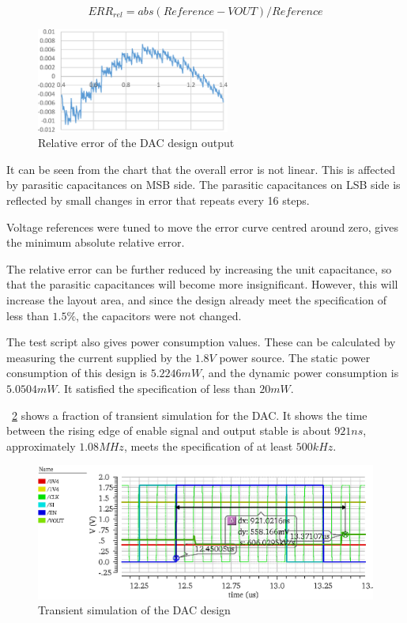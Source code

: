 \documentclass[journal]{IEEEtran}
\newcommand{\fref}[1]{\figurename~\ref{#1}}
\begin{document}
\begin{equation}
	\label{eqn_error}
	ERR_{rel} = abs(Reference - VOUT) / Reference
\end{equation}

\begin{figure}[!t]
	\centering
	\includegraphics[width=2.5in]{Error}
	\caption{Relative error of the DAC design output}
	\label{fig_error}
\end{figure}

It can be seen from the chart that the overall error is not linear. This is affected by parasitic capacitances on MSB side. The parasitic capacitances on LSB side is reflected by small changes in error that repeats every 16 steps.

Voltage references were tuned to move the error curve centred around zero, gives the minimum absolute relative error.

The relative error can be further reduced by increasing the unit capacitance, so that the parasitic capacitances will become more insignificant. However, this will increase the layout area, and since the design already meet the specification of less than $1.5 \%$, the capacitors were not changed.

The test script also gives power consumption values. These can be calculated by measuring the current supplied by the $1.8 V$ power source. The static power consumption of this design is $5.2246 mW$, and the dynamic power consumption is $5.0504 mW$. It satisfied the specification of less than $20 mW$.

\fref{fig_sim_dac} shows a fraction of transient simulation for the DAC. It shows the time between the rising edge of enable signal and output stable is about $921 ns$, approximately $1.08 MHz$, meets the specification of at least $500 kHz$.

\begin{figure}[!t]
	\centering
	\includegraphics[width=\columnwidth]{sim_dac}
	\caption{Transient simulation of the DAC design}
	\label{fig_sim_dac}
\end{figure}
\end{document}
